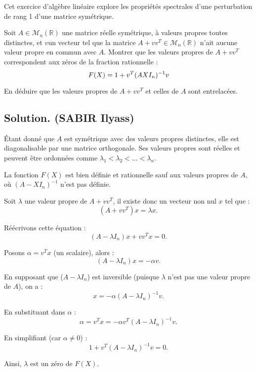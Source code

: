 Cet exercice d'alg{\`e}bre lin{\'e}aire explore les propri{\'e}t{\'e}s
spectrales d'une perturbation de rang 1 d'une matrice sym{\'e}trique.

\begin{exercise}[]
Soit $A \in \mathcal{M}_n (\mathbb{R})$ une matrice r{\'e}elle sym{\'e}trique,
{\`a} valeurs propres toutes distinctes, et $v$un vecteur tel que la matrice
$A + v v^T \in \mathcal{M}_n (\mathbb{R})$ n'ait aucune valeur propre en
commun avec $A$. Montrer que les valeurs propres de $A + v v^T$ correspondent
aux z{\'e}ros de la fraction rationnelle :
\[ F (X) = 1 + v^T (A \nonconverted{minus} X I_n)^{- 1} v \]


En d{\'e}duire que les valeurs propres de $A + v v^T$ et celles de $A$ sont
entrelac{\'e}es.
\end{exercise}

\subsection*{Solution. (SABIR Ilyass)}


{\'E}tant donn{\'e} que $A$ est sym{\'e}trique avec des valeurs propres
distinctes, elle est diagonalisable par une matrice orthogonale. Ses valeurs
propres sont r{\'e}elles et peuvent {\^e}tre ordonn{\'e}es comme $\lambda_1 <
\lambda_2 < \ldots < \lambda_n$.

La fonction $F (X)$ est bien d{\'e}finie et rationnelle sauf aux valeurs
propres de $A$, o{\`u} $(A - XI_n)^{- 1}$ n'est pas d{\'e}finie.

Soit $\lambda$ une valeur propre de $A + vv^T$, il existe donc un vecteur non
nul $x$ tel que :
\[ (A + vv^T) x = \lambda x. \]


R{\'e}{\'e}crivons cette {\'e}quation :
\[ (A - \lambda I_n) x + vv^T x = 0. \]


Posons $\alpha = v^T x$ (un scalaire), alors :
\[ (A - \lambda I_n) x = - \alpha v. \]


En supposant que ($A - \lambda I_n$) est inversible (puisque $\lambda$ n'est
pas une valeur propre de $A$), on a :
\[ x = - \alpha (A - \lambda I_n)^{- 1} v. \]


En substituant dans $\alpha$ :
\[ \alpha = v^T x = - \alpha v^T (A - \lambda I_n)^{- 1} v. \]


En simplifiant (car $\alpha \neq 0$) :
\[ 1 + v^T (A - \lambda I_n)^{- 1} v = 0. \]


Ainsi, $\lambda$ est un z{\'e}ro de $F (X)$.

